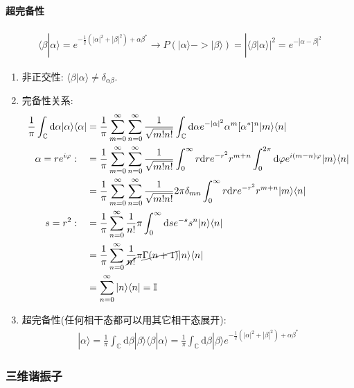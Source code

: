 \documentclass[../../main.tex]{subfiles}
\begin{document}
\paragraph{超完备性}
\begin{align*}
    \langle\beta|\alpha\rangle = e^{-\frac{1}{2}(|\alpha|^{2} + |\beta|^{2}) + \alpha\beta^{*}}\rightarrow P(|\alpha\rangle->|\beta\rangle) = |\langle\beta|\alpha\rangle|^{2} = e^{-|\alpha-\beta|^{2}}
\end{align*}
\begin{enumerate}
    \item 非正交性: $\langle\beta|\alpha\rangle\neq\delta_{\alpha\beta}$. 
    \item 完备性关系: 
\begin{align*}
        \frac{1}{\pi}\int_{\mathbb{C}}\mathrm{d}\alpha|\alpha\rangle\langle\alpha| &= 
        \frac{1}{\pi}\sum_{m=0}^{\infty}\sum_{n=0}^{\infty}\frac{1}{\sqrt{m!n!}}
        \int_{\mathbb{C}}\mathrm{d}\alpha e^{-|\alpha|^{2}}\alpha^{m}[\alpha^{*}]^{n}
        |m\rangle\langle n|\\
        \alpha = re^{i\varphi}:\quad &= 
        \frac{1}{\pi}\sum_{m=0}^{\infty}\sum_{n=0}^{\infty}\frac{1}{\sqrt{m!n!}}
        \int_{0}^{\infty}r\mathrm{d}re^{-r^{2}}r^{m+n}\int_{0}^{2\pi}\mathrm{d}\varphi e^{i(m-n)\varphi}
        |m\rangle\langle n|\\
        &= \frac{1}{\pi}\sum_{m=0}^{\infty}\sum_{n=0}^{\infty}\frac{1}{\sqrt{m!n!}}
        2\pi\delta_{mn}\int_{0}^{\infty}r\mathrm{d}r e^{-r^{2}} r^{m+n}
        |m\rangle\langle n|\\
    s = r^{2}:\quad &= \frac{1}{\pi}\sum_{n=0}^{\infty}\frac{1}{n!}\pi
        \int_{0}^{\infty}\mathrm{d}s e^{-s} s^{n}|n\rangle\langle n|\\
        &= \frac{1}{\pi}\sum_{n=0}^{\infty}\frac{1}{\cancel{n!}}\pi\cancel{\Gamma(n+1)}|n\rangle\langle n|\\
        &= \sum_{n=0}^{\infty}|n\rangle\langle n| = \mathbb{I}
\end{align*}
\item 超完备性(任何相干态都可以用其它相干态展开):
\begin{align*}
    |\alpha\rangle = \frac{1}{\pi}\int_{\mathbb{C}}\mathrm{d}\beta |\beta\rangle\langle\beta|\alpha\rangle = \frac{1}{\pi}\int_{\mathbb{C}}\mathrm{d}\beta |\beta\rangle e^{-\frac{1}{2}(|\alpha|^{2} + |\beta|^{2})+\alpha\beta^{*}}
\end{align*}
\end{enumerate}
\subsubsection{三维谐振子}
\end{document}
